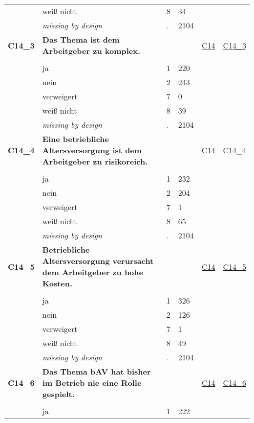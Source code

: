 \begin{longtable}{| L{2.45cm} | L{6cm} | C{1.5cm} | R{1cm} | C{2.25cm} | C{2.25cm} |}
   & weiß nicht & 8 & 34 &  &  \\ 
   & \textit{missing by design} & \textit{.} & 2104 &  &  \\ 
   \midrule
\textbf{C14\_3}\label{var:C14:3} & \textbf{Das Thema ist dem Arbeitgeber zu komplex.} &  &  & \hyperref[C14]{C14} & \hyperref[var:suf:C14:3]{C14\_3} \\ 
   &  &  &  &  &  \\ 
   & ja & 1 & 220 &  &  \\ 
   & nein & 2 & 243 &  &  \\ 
   & verweigert & 7 & 0 &  &  \\ 
   & weiß nicht & 8 & 39 &  &  \\ 
   & \textit{missing by design} & \textit{.} & 2104 &  &  \\ 
   \midrule
\textbf{C14\_4}\label{var:C14:4} & \textbf{Eine betriebliche Altersversorgung ist dem Arbeitgeber zu risikoreich.} &  &  & \hyperref[C14]{C14} & \hyperref[var:suf:C14:4]{C14\_4} \\ 
   &  &  &  &  &  \\ 
   & ja & 1 & 232 &  &  \\ 
   & nein & 2 & 204 &  &  \\ 
   & verweigert & 7 & 1 &  &  \\ 
   & weiß nicht & 8 & 65 &  &  \\ 
   & \textit{missing by design} & \textit{.} & 2104 &  &  \\ 
   \midrule
\textbf{C14\_5}\label{var:C14:5} & \textbf{Betriebliche Altersversorgung verursacht dem Arbeitgeber zu hohe Kosten.} &  &  & \hyperref[C14]{C14} & \hyperref[var:suf:C14:5]{C14\_5} \\ 
   &  &  &  &  &  \\ 
   & ja & 1 & 326 &  &  \\ 
   & nein & 2 & 126 &  &  \\ 
   & verweigert & 7 & 1 &  &  \\ 
   & weiß nicht & 8 & 49 &  &  \\ 
   & \textit{missing by design} & \textit{.} & 2104 &  &  \\ 
   \midrule
\textbf{C14\_6}\label{var:C14:6} & \textbf{Das Thema bAV hat bisher im Betrieb nie eine Rolle gespielt.} &  &  & \hyperref[C14]{C14} & \hyperref[var:suf:C14:6]{C14\_6} \\ 
   &  &  &  &  &  \\ 
   & ja & 1 & 222 &  &  \\ 

\end{longtable}

